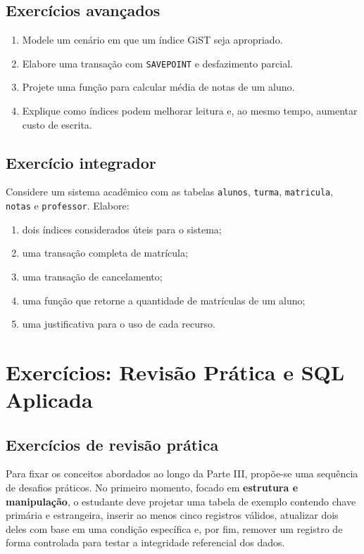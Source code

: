 \subsection{Exercícios avançados}

\begin{enumerate}
    \item Modele um cenário em que um índice GiST seja apropriado.
    \item Elabore uma transação com \texttt{SAVEPOINT} e desfazimento parcial.
    \item Projete uma função para calcular média de notas de um aluno.
    \item Explique como índices podem melhorar leitura e, ao mesmo tempo, aumentar custo de escrita.
\end{enumerate}

\subsection{Exercício integrador}

Considere um sistema acadêmico com as tabelas \texttt{alunos}, \texttt{turma}, \texttt{matricula}, \texttt{notas} e \texttt{professor}. Elabore:

\begin{enumerate}
    \item dois índices considerados úteis para o sistema;
    \item uma transação completa de matrícula;
    \item uma transação de cancelamento;
    \item uma função que retorne a quantidade de matrículas de um aluno;
    \item uma justificativa para o uso de cada recurso.
\end{enumerate}



\section{Exercícios: Revisão Prática e SQL Aplicada}
\subsection{Exercícios de revisão prática}

Para fixar os conceitos abordados ao longo da Parte III, propõe-se uma sequência de desafios práticos. No primeiro momento, focado em \textbf{estrutura e manipulação}, o estudante deve projetar uma tabela de exemplo contendo chave primária e estrangeira, inserir ao menos cinco registros válidos, atualizar dois deles com base em uma condição específica e, por fim, remover um registro de forma controlada para testar a integridade referencial dos dados.

